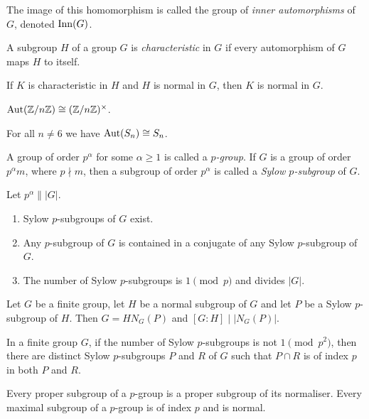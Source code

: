 \begin{defn}
    The image of this homomorphism is called the group of \emph{inner
    automorphisms} of $G$, denoted $\mathrm{Inn}(G)$.
\end{defn}
\begin{defn}
    A subgroup $H$ of a group $G$ is \emph{characteristic} in $G$ if every
    automorphism of $G$ maps $H$ to itself.
\end{defn}
\begin{prop}
    If $K$ is characteristic in $H$ and $H$ is normal in $G$, then $K$ is normal
    in $G$.
\end{prop}
\begin{prop}
    $\mathrm{Aut}(\mathbb{Z}/n\mathbb{Z})\cong(\mathbb{Z}/n\mathbb{Z})^\times$.
\end{prop}
\begin{prop}
    For all $n\ne 6$ we have $\mathrm{Aut}(S_n)\cong S_n$. 
\end{prop}
\begin{defn}
    A group of order $p^\alpha$ for some $\alpha\ge 1$ is called a
    \emph{$p$-group}. If $G$ is a group of order $p^\alpha m$, where $p\nmid m$,
    then a subgroup of order $p^\alpha$ is called a \emph{Sylow $p$-subgroup} of
    $G$.
\end{defn}
\begin{thm}[Sylow]
    Let $p^\alpha\||G|$.
    \begin{enumerate}
        \item Sylow $p$-subgroups of $G$ exist.
        \item Any $p$-subgroup of $G$ is contained in a conjugate of any Sylow
            $p$-subgroup of $G$.
        \item The number of Sylow $p$-subgroups is $1\pmod p$ and divides $|G|$.
    \end{enumerate}
\end{thm}
\begin{prop}
    Let $G$ be a finite group, let $H$ be a normal subgroup of $G$ and let $P$
    be a Sylow $p$-subgroup of $H$. Then $G=HN_G(P)$ and $[G:H]\mid |N_G(P)|$.
\end{prop}
\begin{prop}
    In a finite group $G$, if the number of Sylow $p$-subgroups is not
    $1\pmod{p^2}$, then there are distinct Sylow $p$-subgroups $P$ and $R$ of
    $G$ such that $P\cap R$ is of index $p$ in both $P$ and $R$.
\end{prop}
\begin{prop}
    Every proper subgroup of a $p$-group is a proper subgroup of its normaliser.
    Every maximal subgroup of a $p$-group is of index $p$ and is normal.
\end{prop}
